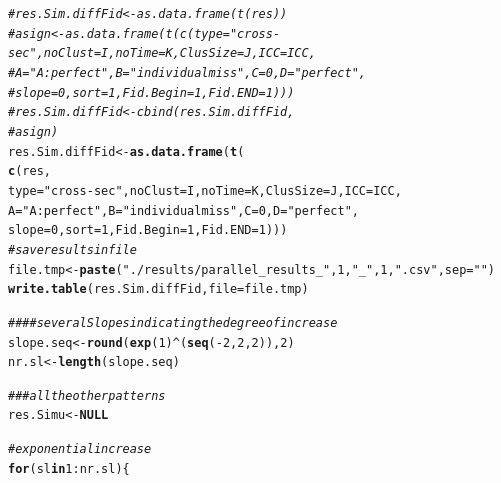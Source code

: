 \documentclass{article}\usepackage[]{graphicx}\usepackage[]{color}
\makeatletter
\newcommand{\hlnum}[1]{\textcolor[rgb]{0.686,0.059,0.569}{#1}}%
\newcommand{\hlstr}[1]{\textcolor[rgb]{0.192,0.494,0.8}{#1}}%
\newcommand{\hlcom}[1]{\textcolor[rgb]{0.678,0.584,0.686}{\textit{#1}}}%
\newcommand{\hlopt}[1]{\textcolor[rgb]{0,0,0}{#1}}%
\newcommand{\hlstd}[1]{\textcolor[rgb]{0.345,0.345,0.345}{#1}}%
\newcommand{\hlkwa}[1]{\textcolor[rgb]{0.161,0.373,0.58}{\textbf{#1}}}%
\newcommand{\hlkwb}[1]{\textcolor[rgb]{0.69,0.353,0.396}{#1}}%
\newcommand{\hlkwc}[1]{\textcolor[rgb]{0.333,0.667,0.333}{#1}}%
\newcommand{\hlkwd}[1]{\textcolor[rgb]{0.737,0.353,0.396}{\textbf{#1}}}%
\newenvironment{kframe}{%
 \def\at@end@of@kframe{}%
 \ifinner\ifhmode%
  \def\at@end@of@kframe{\end{minipage}}%
  \begin{minipage}{\columnwidth}%
 \fi\fi%
 \def\FrameCommand##1{\hskip\@totalleftmargin \hskip-\fboxsep
 \colorbox{shadecolor}{##1}\hskip-\fboxsep
     \hskip-\linewidth \hskip-\@totalleftmargin \hskip\columnwidth}%
 \MakeFramed {\advance\hsize-\width
   \@totalleftmargin\z@ \linewidth\hsize
   \@setminipage}}%
 {\par\unskip\endMakeFramed%
 \at@end@of@kframe}
\newenvironment{knitrout}{}{} %
\makeatother
\begin{document}
\begin{knitrout}
\begin{kframe}
{\ttfamily\noindent\color{warningcolor}{\#\# Warning in optwrap(optimizer, devfun, x@theta, lower = x@lower, calc.derivs = TRUE, : convergence code 3 from bobyqa: bobyqa -- a trust region step failed to reduce q}}\begin{alltt}
\hlcom{# res.Sim.diffFid<-as.data.frame( t(res))}
\hlcom{# asign<-as.data.frame( t(c(type="cross-sec", noClust=I, noTime=K, ClusSize=J,  ICC=ICC,}
\hlcom{#                         A="A: perfect", B="individual miss", C=0, D="perfect", }
\hlcom{#                         slope=0, sort=1, Fid.Begin=1, Fid.END=1)))}
\hlcom{# res.Sim.diffFid<-cbind(res.Sim.diffFid,}
\hlcom{#                        asign)}
\hlstd{res.Sim.diffFid}\hlkwb{<-}\hlkwd{as.data.frame}\hlstd{(}\hlkwd{t}\hlstd{(}
                      \hlkwd{c}\hlstd{(res,}
                      \hlkwc{type}\hlstd{=}\hlstr{"cross-sec"}\hlstd{,} \hlkwc{noClust}\hlstd{=I,} \hlkwc{noTime}\hlstd{=K,} \hlkwc{ClusSize}\hlstd{=J,}  \hlkwc{ICC}\hlstd{=ICC,}
                        \hlkwc{A}\hlstd{=}\hlstr{"A: perfect"}\hlstd{,} \hlkwc{B}\hlstd{=}\hlstr{"individual miss"}\hlstd{,} \hlkwc{C}\hlstd{=}\hlnum{0}\hlstd{,} \hlkwc{D}\hlstd{=}\hlstr{"perfect"}\hlstd{,}
                        \hlkwc{slope}\hlstd{=}\hlnum{0}\hlstd{,} \hlkwc{sort}\hlstd{=}\hlnum{1}\hlstd{,} \hlkwc{Fid.Begin}\hlstd{=}\hlnum{1}\hlstd{,} \hlkwc{Fid.END}\hlstd{=}\hlnum{1}\hlstd{)))}
\hlcom{#save results in file}
\hlstd{file.tmp}\hlkwb{<-}\hlkwd{paste}\hlstd{(}\hlstr{"./results/parallel_results_"}\hlstd{,} \hlnum{1}\hlstd{,} \hlstr{"_"}\hlstd{,} \hlnum{1}\hlstd{,} \hlstr{".csv"}\hlstd{,} \hlkwc{sep}\hlstd{=}\hlstr{""}\hlstd{)}
\hlkwd{write.table}\hlstd{(res.Sim.diffFid,} \hlkwc{file}\hlstd{=file.tmp)}

\hlcom{####several Slopes indicating the degree of increase}
\hlstd{slope.seq}\hlkwb{<-}\hlkwd{round}\hlstd{(}\hlkwd{exp}\hlstd{(}\hlnum{1}\hlstd{)}\hlopt{^}\hlstd{(}\hlkwd{seq}\hlstd{(}\hlopt{-}\hlnum{2}\hlstd{,}\hlnum{2}\hlstd{,}\hlnum{2}\hlstd{)),}\hlnum{2}\hlstd{)}
\hlstd{nr.sl}\hlkwb{<-}\hlkwd{length}\hlstd{(slope.seq)}


\hlcom{###all the other patterns}
\hlstd{res.Simu}\hlkwb{<-}\hlkwa{NULL}

\hlcom{#exponential increase}
\hlkwa{for}\hlstd{(sl} \hlkwa{in} \hlnum{1}\hlopt{:}\hlstd{nr.sl)\{}


\end{alltt}
\end{kframe}
\end{knitrout}
\end{document}
